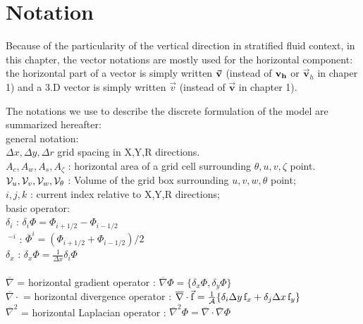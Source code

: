 
\section{Notation} 

Because of the particularity of the vertical direction in stratified fluid
context, in this chapter, the vector notations are mostly used
for the horizontal component:
the horizontal part of a vector is simply written 
$\vec{\bf v}$ (instead of ${\bf v_h}$ or $\vec{\mathbf{v}}_{h}$ in chaper 1)
and a 3.D vector is simply written $\vec{v}$ (instead of $\vec{\mathbf{v}}$ 
in chapter 1).

The notations we use to describe the discrete formulation 
of the model are summarized hereafter:\\
general notation:
\\ $\Delta x, \Delta y, \Delta r$ grid spacing in X,Y,R directions.
\\ $A_c,A_w,A_s,A_{\zeta}$ : 
horizontal area of a grid cell surrounding $\theta,u,v,\zeta$ point.
\\ ${\cal V}_u , {\cal V}_v , {\cal V}_w , {\cal V}_\theta$ :
Volume of the grid box surrounding $u,v,w,\theta$ point;
\\ $i,j,k$ : current index relative to X,Y,R directions;
\\basic operator:
\\ $\delta_i $ : $\delta_i \Phi = \Phi_{i+1/2} - \Phi_{i-1/2} $
\label{eq:delta_i}
\\ $~^{-i}$ : $\overline{\Phi}^i = ( \Phi_{i+1/2} + \Phi_{i-1/2} ) / 2 $ 
\label{eq:bar_i}
\\ $\delta_x $ : $\delta_x \Phi = \frac{1}{\Delta x} \delta_i \Phi $
\label{eq:delta_x}
\\
\\ $\overline{\nabla}$ = horizontal gradient operator :  
$\overline{\nabla} \Phi = \{ \delta_x \Phi , \delta_y \Phi \}$
\label{eq:d_grad}
\\ $\overline{\nabla} \cdot$ = horizontal divergence operator :  
$\overline{\nabla}\cdot \vec{\mathrm{f}}  = 
\frac{1}{\cal A} \{ \delta_i \Delta y \, \mathrm{f}_x 
                  + \delta_j \Delta x \, \mathrm{f}_y \} $
\label{eq:d_div}
\\ $\overline{\nabla}^2 $ = horizontal Laplacian operator :
$ \overline{\nabla}^2 \Phi = 
   \overline{\nabla}\cdot \overline{\nabla}\Phi $
\label{eq:d_lap}
